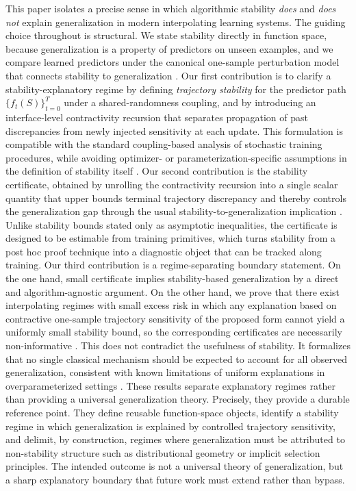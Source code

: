 \documentclass{article}
\numberwithin{equation}{section}
\begin{document}
This paper isolates a precise sense in which algorithmic stability \emph{does} and \emph{does not} explain generalization in modern interpolating learning systems. The guiding choice throughout is structural. We state stability directly in function space, because generalization is a property of predictors on unseen examples, and we compare learned predictors under the canonical one-sample perturbation model that connects stability to generalization \cite{bousquet2002stability}. Our first contribution is to clarify a stability-explanatory regime by defining \emph{trajectory stability} for the predictor path $\{f_t(S)\}_{t=0}^T$ under a shared-randomness coupling, and by introducing an interface-level contractivity recursion that separates propagation of past discrepancies from newly injected sensitivity at each update. This formulation is compatible with the standard coupling-based analysis of stochastic training procedures, while avoiding optimizer- or parameterization-specific assumptions in the definition of stability itself \cite{pmlr-v48-hardt16}. Our second contribution is the stability certificate, obtained by unrolling the contractivity recursion into a single scalar quantity that upper bounds terminal trajectory discrepancy and thereby controls the generalization gap through the usual stability-to-generalization implication \cite{bousquet2002stability}. Unlike stability bounds stated only as asymptotic inequalities, the certificate is designed to be estimable from training primitives, which turns stability from a post hoc proof technique into a diagnostic object that can be tracked along training. Our third contribution is a regime-separating boundary statement. On the one hand, small certificate implies stability-based generalization by a direct and algorithm-agnostic argument. On the other hand, we prove that there exist interpolating regimes with small excess risk in which any explanation based on contractive one-sample trajectory sensitivity of the proposed form cannot yield a uniformly small stability bound, so the corresponding certificates are necessarily non-informative \cite{BartlettLongLugosiTsigler2020}. This does not contradict the usefulness of stability. It formalizes that no single classical mechanism should be expected to account for all observed generalization, consistent with known limitations of uniform explanations in overparameterized settings \cite{NagarajanKolter2019}. These results separate explanatory regimes rather than providing a universal generalization theory. Precisely, they provide a durable reference point. They define reusable function-space objects, identify a stability regime in which generalization is explained by controlled trajectory sensitivity, and delimit, by construction, regimes where generalization must be attributed to non-stability structure such as distributional geometry or implicit selection principles. The intended outcome is not a universal theory of generalization, but a sharp explanatory boundary that future work must extend rather than bypass.
\end{document}

